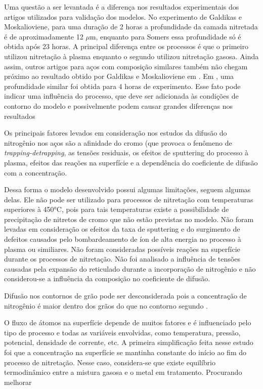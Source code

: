 Uma questão a ser levantada é a diferença nos resultados experimentais dos artigos utilizados para validação dos modelos. No experimento de Galdikas e Moskalioviene, para uma duração de 2 horas a profundidade da camada nitretada é de aproximadamente   12 $\mu$m, enquanto para Somers essa profundidade só é obtida após 23 horas. A principal diferença entre os processos é que o primeiro utilizou nitretação à plasma enquanto o segundo utilizou nitretação gasosa.  Ainda assim, outros artigos para aços com composição similares também não chegam próximo ao resultado obtido por Galdikas e Moskalioviene em \cite{moskalioviene2011modeling}. Em \cite{galdikas2011modeling}, uma profundidade similar foi obtida para 4 horas de experimento. Esse fato pode indicar uma influência do processo, que deve ser adicionada às condições de contorno do modelo e possivelmente podem causar grandes diferenças nos resultados

Os principais fatores levados em consideração nos estudos da difusão do nitrogênio nos aços são a afinidade do cromo (que provoca o fenômeno de \textit{trapping-detrapping}, as tensões residuais, os efeitos de sputtering do processo à plasma, efeitos das reações na superfície e a dependência do coeficiente de difusão com a concentração.

Dessa forma o modelo desenvolvido possui algumas limitações, seguem algumas delas. Ele não pode ser utilizado para processos de nitretação com temperaturas superiores à 450°C, pois para tais temperaturas existe a possibilidade de precipitação de nitretos de cromo que não estão previstas no modelo. Não foram levadas em consideração os efeitos da taxa de sputtering e do surgimento de defeitos causados pelo bombardeamento de íon de alta energia no processo à plasma ou similiares. Não foram consideradas possíveis reações na superfície durante os processos de nitretação. Não foi analisado a influência de tensões causadas pela expansão do reticulado durante a incorporação de nitrogênio e não considerou-se a influência da composição no coeficiente de difusão.

Difusão nos contornos de grão pode ser desconsiderada pois a concentração de nitrogênio é maior dentro dos grãos do que no contorno segundo \cite{parascandola2000nitrogen}.

O fluxo de átomos na superfície depende de muitos fatores e é influenciado pelo tipo de processo e todas as variáveis envolvidas, como temperatura, pressão, potencial, densidade de corrente, etc.
A primeira simplificação feita nesse estudo foi que a concentração na superfície se mantinha constante do início ao fim do processo de nitretação. Nesse caso, considera-se que existe equilíbrio termodinâmico entre a  mistura gasosa e o metal em tratamento.
Procurando melhorar 

